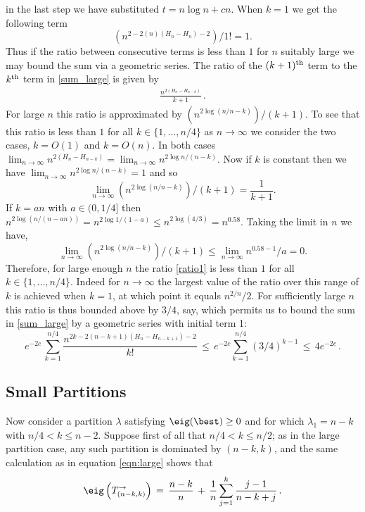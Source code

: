 \documentclass[11pt]{report}
\begin{document}
in the last step we have substituted $t=n\log n + cn$. When $k=1$ we 
get the following term
\[\left(n^{2-2(n)(H_{n}-H_{n})-2}\right)/1! = 1.\]
Thus if the ratio between consecutive terms is less than $1$ for $n$ 
suitably 
large we may bound the 
sum via a geometric series.
The ratio of the $(k+1)^{\textnormal{th}}$ term to the $k^{\textnormal{th}}$ term in 
\eqref{sum_large} is given 
by 
\begin{eqnarray}
\label{ratio1}
\frac{n^{2(H_n-H_{n-k})}}{k+1}\,.
\end{eqnarray}
For large $n$ this ratio is approximated by $(n^{2\log (n/n-k)})/(k+1)$. To 
see that this ratio is less than $1$ for all $k\in \{1,\dots,n/4\}$ as 
$n\rightarrow \infty$ we consider the two cases, $k =O(1)$ and $k=O(n)$.  In both cases $\lim_{n\to\infty} n^{2(H_{n} - H_{n-k})}  = \lim_{n\to\infty} n^{2\log n/(n-k)}$. Now if $k$ is 
constant then we have $\lim_{n\to\infty} n^{2\log n/ (n-k)} = 1$ and so 
\[\lim_{n\to\infty} (n^{2\log (n/n-k)})/(k+1) = \frac{1}{k+1}.\] If $k = an$ with $a\in(0,1/4]$ then $n^{2\log (n/(n-an))} = n^{2\log 
	1/(1-a)} 
\leq n^{2\log (4/3)} = n^{0.58}$. Taking the limit in $n$ we have,
\[\lim_{n\to\infty} (n^{2\log (n/n-k)})/(k+1) \leq \lim_{n\to\infty} 
n^{0.58-1}/a = 0.\]
Therefore, for large enough $n$ the ratio \eqref{ratio1} is less than $1$ 
for all $k \in \{1,\dots,n/4\}$. Indeed for $n\to \infty$ the largest value 
of the ratio over this range of $k$ 
is achieved when $k=1$, at which point it equals $n^{2/n}/2$. For 
sufficiently large $n$ this ratio is thus bounded above by $3/4$, say, 
which permits us to bound the sum in \eqref{sum_large} by a geometric 
series with initial	term 1:
\begin{equation}
\label{eqn:sum_large_1}
e^{-2c}\,	\sum_{k=1}^{n/4}
\frac{n^{2k-2(n-k+1)(H_{n}-H_{n-k+1})-2}}{k!} \, \le \,
e^{-2c}	\sum_{k=1}^{n/4} (3/4)^{k-1} \,\le\, 4e^{-2c}\,.
\end{equation}




\subsection{Small Partitions}

Now consider a partition $\lambda$ satisfying $\eig(\best)\ge 0$ and for which 
$\lambda_1 = n-k$ with  $n/4<k\le n-2$. Suppose first of all that $n/4<k\le n/2$; as in the large partition case, any such partition is dominated by $(n-k,k)$, and the same calculation as in equation \eqref{eqn:large} shows that 
\begin{equation}\label{eqn:medium}
\eig\left(T_{(n-k,k)}^{\rightarrow}\right)  
\,=\, \frac{n-k}{n} \,+\, \frac 1n \sum_{j=1}^{k} 
\frac{j-1}{n-k+j} \,. 
\end{equation}
\end{document}
